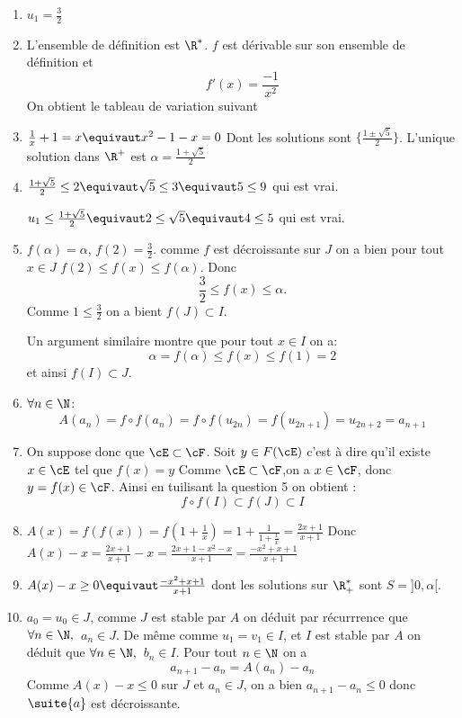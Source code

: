 \documentclass[a4paper, 11pt,reqno]{article}
\begin{document}
\begin{correction}
\begin{enumerate}
\item $u_1=\frac{3}{2}$
\item L'ensemble de définition est $\R^*$.  $f$ est dérivable sur son ensemble de définition et 
$$f'(x) =\frac{-1}{x^2}$$
On obtient le tableau de variation suivant 




\item $\frac{1}{x}+1=x\equivaut x^2-1-x=0$
Dont les solutions sont $\{ \frac{1\pm\sqrt{5}}{2}\}$. L'unique solution dans $\R^+$ est $\alpha = \frac{1+\sqrt{5}}{2}$

\item $\frac{1+\sqrt{5}}{2}\leq 2 \equivaut \sqrt{5}\leq 3 \equivaut 5\leq 9$ qui est vrai. 

$u_1 \leq \frac{1+\sqrt{5}}{2} \equivaut 2\leq \sqrt{5} \equivaut 4 \leq 5$ qui est vrai. 

\item $f(\alpha) =\alpha$, $f(2) =\frac{3}{2}$. comme $f$ est décroissante sur $J$ on a bien pour tout $x\in J$ 
$f(2)\leq f(x)\leq f(\alpha)$. Donc 
$$\frac{3}{2}\leq f(x) \leq \alpha.$$ 
Comme $1\leq \frac{3}{2}$ on  a bient $f(J)\subset I$. 

Un argument similaire montre que pour tout $x\in I$ on  a:
$$\alpha =f(\alpha) \leq f(x)\leq f(1)=2$$
et ainsi $f(I)\subset J$. 
\item $\forall n\in\N$:
$$A(a_n) = f\circ f(a_n)=f\circ f (u_{2n})= f(u_{2n+1}) = u_{2n+2}=a_{n+1}$$

\item On suppose donc que $\cE\subset \cF$. Soit $y\in F(\cE)$ c'est à dire qu'il existe $x\in \cE$ tel que $f(x)=y$
Comme $\cE\subset \cF$,on a $x\in \cF$, donc $y=f(x)\in \cF$. Ainsi en tuilisant la question 5 on obtient : 
$$f\circ f(I) \subset f(J) \subset I$$

\item $A(x)=f(f(x))=f(  1+\frac{1}{x}) =1 + \frac{1}{1+\frac{1}{x}}= \frac{2x+1}{x+1} $
Donc $A(x) - x = \frac{2x+1}{x+1}  -x = \frac{2x+1-x^2 -x}{x+1} = \frac{-x^2+x+1}{x+1}$ 
\item $A(x)-x\geq 0 \equivaut \frac{-x^2+x+1}{x+1}$ dont les solutions sur $\R_+^*$ sont $S= ]0,\alpha [$. 
\item $a_0 =u_0 \in J$, comme $J$ est stable par $A$ on déduit par récurrrence que $\forall n\in \N,\, $ $a_n\in J$.
De même comme $u_1=v_1 \in I$, et $I$  est stable par $A$ on déduit que $\forall n\in \N,\,$ $b_n\in I$.
Pour tout $n\in \N$ on  a 
$$a_{n+1}-a_n= A(a_n)-a_n$$
Comme $ A(x)-x\leq 0 $ sur $J$ et $a_n\in J$, on a bien $a_{n+1}-a_{n}\leq 0$ donc $\suite{a}$ est décroissante. 


\end{enumerate}
\end{correction}
\end{document}
